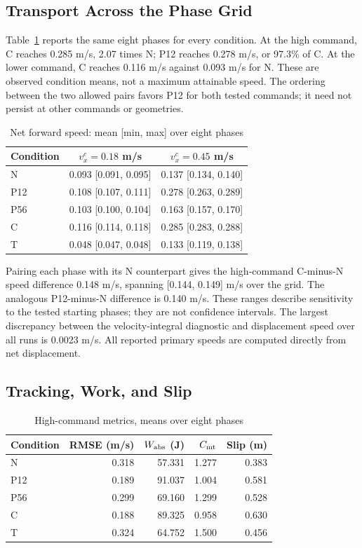 \subsection{Transport Across the Phase Grid}
Table~\ref{tab:speed} reports the same eight phases for every condition. At the high command, C reaches 0.285 m/s, 2.07 times N; P12 reaches 0.278 m/s, or 97.3\% of C. At the lower command, C reaches 0.116 m/s against 0.093 m/s for N. These are observed condition means, not a maximum attainable speed. The ordering between the two allowed pairs favors P12 for both tested commands; it need not persist at other commands or geometries.

\begin{table}[t]
\caption{Net forward speed: mean [min, max] over eight phases}
\label{tab:speed}\centering\small
\begin{tabular}{lcc}\toprule
Condition & $v_x^c=0.18$ m/s & $v_x^c=0.45$ m/s\\\midrule
N & 0.093 [0.091, 0.095] & 0.137 [0.134, 0.140]\\
P12 & 0.108 [0.107, 0.111] & 0.278 [0.263, 0.289]\\
P56 & 0.103 [0.100, 0.104] & 0.163 [0.157, 0.170]\\
C & 0.116 [0.114, 0.118] & 0.285 [0.283, 0.288]\\
T & 0.048 [0.047, 0.048] & 0.133 [0.119, 0.138]\\
\bottomrule\end{tabular}\end{table}

Pairing each phase with its N counterpart gives the high-command C-minus-N speed difference 0.148 m/s, spanning [0.144, 0.149] m/s over the grid. The analogous P12-minus-N difference is 0.140 m/s. These ranges describe sensitivity to the tested starting phases; they are not confidence intervals. The largest discrepancy between the velocity-integral diagnostic and displacement speed over all runs is 0.0023 m/s. All reported primary speeds are computed directly from net displacement.

\subsection{Tracking, Work, and Slip}
\begin{table}[t]
\caption{High-command metrics, means over eight phases}
\label{tab:cost}\centering\small
\begin{tabular}{lrrrr}\toprule
Condition & RMSE (m/s) & $W_{\rm abs}$ (J) & $C_{\rm mt}$ & Slip (m)\\\midrule
N & 0.318 & 57.331 & 1.277 & 0.383\\
P12 & 0.189 & 91.037 & 1.004 & 0.581\\
P56 & 0.299 & 69.160 & 1.299 & 0.528\\
C & 0.188 & 89.325 & 0.958 & 0.630\\
T & 0.324 & 64.752 & 1.500 & 0.456\\
\bottomrule\end{tabular}\end{table}

